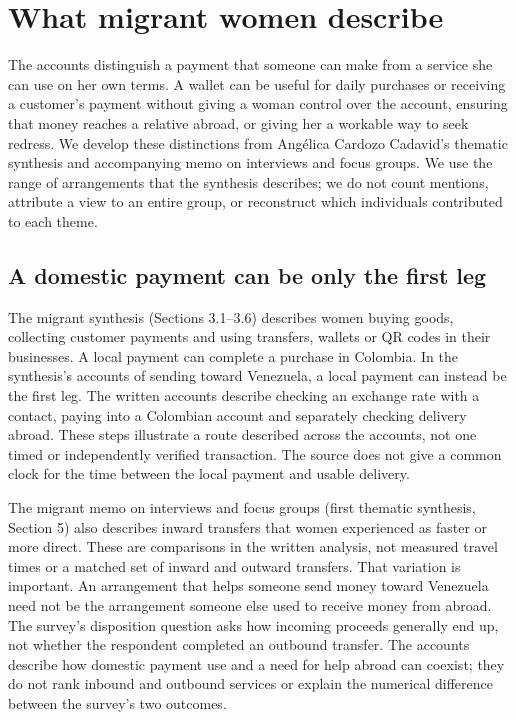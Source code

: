 \section{What migrant women describe}
\label{sec:migrant-findings}
The accounts distinguish a payment that someone can make from a service she can use on her own terms. A wallet can be useful for daily purchases or receiving a customer's payment without giving a woman control over the account, ensuring that money reaches a relative abroad, or giving her a workable way to seek redress. We develop these distinctions from Angélica Cardozo Cadavid's thematic synthesis and accompanying memo on interviews and focus groups. We use the range of arrangements that the synthesis describes; we do not count mentions, attribute a view to an entire group, or reconstruct which individuals contributed to each theme.

\subsection{A domestic payment can be only the first leg}
\label{sec:migrant-journeys}

The migrant synthesis (Sections 3.1--3.6) describes women buying goods, collecting customer payments and using transfers, wallets or QR codes in their businesses. A local payment can complete a purchase in Colombia. In the synthesis's accounts of sending toward Venezuela, a local payment can instead be the first leg. The written accounts describe checking an exchange rate with a contact, paying into a Colombian account and separately checking delivery abroad. These steps illustrate a route described across the accounts, not one timed or independently verified transaction. The source does not give a common clock for the time between the local payment and usable delivery.

The migrant memo on interviews and focus groups (first thematic synthesis, Section 5) also describes inward transfers that women experienced as faster or more direct. These are comparisons in the written analysis, not measured travel times or a matched set of inward and outward transfers. That variation is important. An arrangement that helps someone send money toward Venezuela need not be the arrangement someone else used to receive money from abroad. The survey's disposition question asks how incoming proceeds generally end up, not whether the respondent completed an outbound transfer. The accounts describe how domestic payment use and a need for help abroad can coexist; they do not rank inbound and outbound services or explain the numerical difference between the survey's two outcomes.

